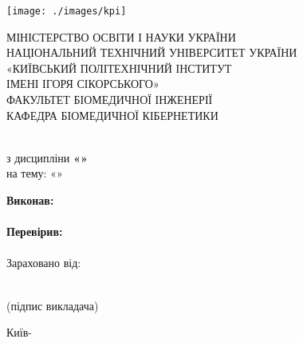 \begin{titlepage}
    \begin{minipage}{\textwidth}
        \begin{minipage}{0.3\textwidth}
            \texttt{[image: ./images/kpi]}
        \end{minipage}
        \hfill
        \begin{minipage}{0.7\textwidth}
            \centering
            \Large
            МІНІСТЕРСТВО ОСВІТИ І НАУКИ УКРАЇНИ \\
            НАЦІОНАЛЬНИЙ ТЕХНІЧНИЙ УНІВЕРСИТЕТ УКРАЇНИ \\
            «КИЇВСЬКИЙ ПОЛІТЕХНІЧНИЙ ІНСТИТУТ \\
            ІМЕНІ ІГОРЯ СІКОРСЬКОГО» \\
            ФАКУЛЬТЕТ БІОМЕДИЧНОЇ ІНЖЕНЕРІЇ \\
            КАФЕДРА БІОМЕДИЧНОЇ КІБЕРНЕТИКИ
        \end{minipage}
    \end{minipage}

    \vfill

    \begin{center}
        \LARGE
        \textbf{\TITLE} \\
        з дисципліни \textbf{«\DISCIPLINE»} \\
        на тему: «\SUBJECT»
    \end{center}

    \vfill

    \begin{minipage}{\textwidth}
        \hfill
        \begin{minipage}{0.4\textwidth}
            \Large

            \textbf{Виконав:} \\
            \STUDENT \\
            \textbf{Перевірив:} \\
            \TEACHER \\

            Зараховано від:
            \hrulefill \\
            \begin{center}
                \small
                \hrulefill \\
                (підпис викладача)
            \end{center}
        \end{minipage}
    \end{minipage}

    \vfill

    \begin{center}
        \LARGE
        Київ-\the\year{}
    \end{center}
\end{titlepage}
